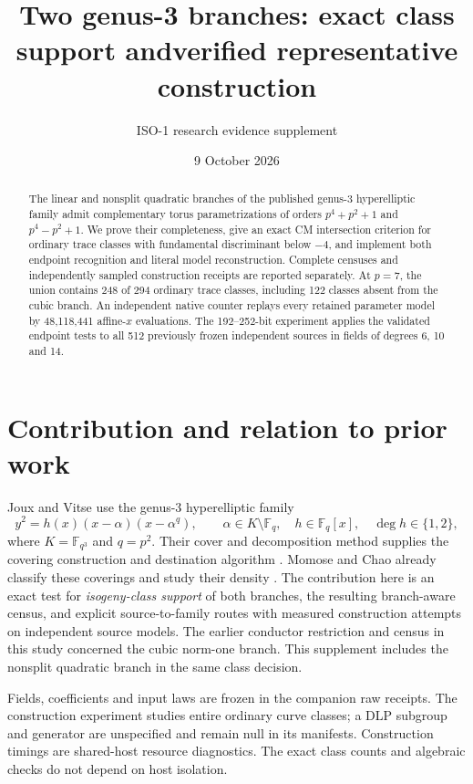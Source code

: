 \documentclass[11pt]{article}
\title{Two genus-3 branches: exact class support and\newline verified representative construction}
\author{ISO-1 research evidence supplement}
\date{9 October 2026}
\newcommand{\F}{\mathbb F}
\begin{document}
\maketitle
\begin{abstract}
The linear and nonsplit quadratic branches of the published genus-3
hyperelliptic family admit complementary torus parametrizations of orders
$p^4+p^2+1$ and $p^4-p^2+1$. We prove their completeness, give an exact
CM intersection criterion for ordinary trace classes with fundamental
discriminant below $-4$, and implement both endpoint recognition and literal
model reconstruction. Complete censuses and independently sampled construction
receipts are reported separately. At $p=7$, the union contains 248 of 294
ordinary trace classes, including 122 classes absent from the cubic branch.
An independent native counter replays every retained parameter model by
48,118,441 affine-$x$ evaluations. The 192--252-bit experiment applies the
validated endpoint tests to all 512 previously frozen independent sources
in fields of degrees 6, 10 and 14.
\end{abstract}

\section{Contribution and relation to prior work}
Joux and Vitse use the genus-3 hyperelliptic family
\begin{equation}\label{family}
 y^2=h(x)(x-\alpha)(x-\alpha^q),\qquad
 \alpha\in K\setminus\F_q,\quad h\in\F_q[x],\quad \deg h\in\{1,2\},
\end{equation}
where $K=\F_{q^3}$ and $q=p^2$. Their cover and decomposition method supplies
the covering construction and destination algorithm \cite{JV}. Momose and
Chao already classify these coverings and study their density \cite{MC}.
The contribution here is an exact test for \emph{isogeny-class support} of
both branches, the resulting branch-aware census, and explicit source-to-family
routes with measured construction attempts on independent source models.
The earlier conductor restriction and census in this study concerned the
cubic norm-one branch. This supplement includes the nonsplit quadratic branch
in the same class decision.

Fields, coefficients and input laws are frozen in the companion raw receipts.
The construction experiment studies entire ordinary curve classes; a DLP
subgroup and generator are unspecified and remain null in its manifests.
Construction timings are shared-host resource diagnostics. The exact class
counts and algebraic checks do not depend on host isolation.
\end{document}

